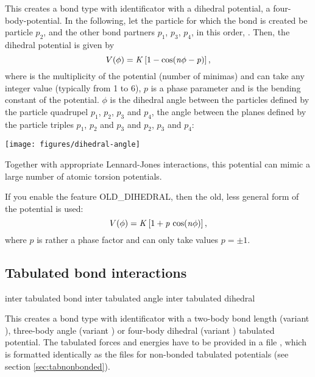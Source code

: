 This creates a bond type with identificator 
with a dihedral potential, \ie a four-body-potential. In the following,
let the particle for which the bond is created be particle $p_2$, and
the other bond partners $p_1$, $p_3$, $p_4$, in this order, \ie
{}. Then, the
dihedral potential is given by
\begin{equation}
  V(\phi) = \mathrm{\mathit{K}}\left[1 - \cos(\mathrm{\mathit{n}}\phi - \mathrm{\mathit{p}})\right],
\end{equation}
where  is the multiplicity of the potential (number of minimas)
and can take any integer value (typically from 1 to 6), $p$ is a phase
parameter and  is the bending constant of the potential. $\phi$
is the dihedral angle between the particles defined by the particle
quadrupel $p_1$, $p_2$, $p_3$ and $p_4$, \ie the angle between the
planes defined by the particle triples $p_1$, $p_2$ and $p_3$ and
$p_2$, $p_3$ and $p_4$:
\begin{center}
  \texttt{[image: figures/dihedral-angle]}
\end{center}
Together with appropriate Lennard-Jones interactions, this potential
can mimic a large number of atomic torsion potentials.

If you enable the feature OLD_DIHEDRAL, then the old, less
general form of the potential is used:
\begin{equation}
  V(\phi) = \mathrm{\mathit{K}}\left[1 + \mathrm{\mathit{p}}\,\cos(\mathrm{\mathit{n}}\phi)\right],
\end{equation}
where $p$ is rather a phase factor and can only take values $p=\pm 1$.

\subsection{Tabulated bond interactions}

\begin{essyntax}
     inter 
    tabulated bond 
     inter 
    tabulated angle 
     inter 
    tabulated dihedral 
\end{essyntax}

This creates a bond type with identificator  with a
two-body bond length (variant ), three-body angle (variant
) or four-body dihedral (variant ) tabulated
potential. The tabulated forces and energies have to be provided in a
file , which is formatted identically as the files for
non-bonded tabulated potentials (see section \ref{sec:tabnonbonded}).

